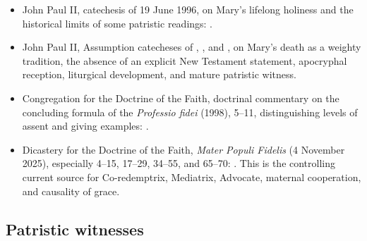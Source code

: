 \begin{itemize}
  \item John Paul II, catechesis of 19 June 1996, on Mary's lifelong holiness and the historical limits of some patristic readings: .
  \item John Paul II, Assumption catecheses of , , and , on Mary's death as a weighty tradition, the absence of an explicit New Testament statement, apocryphal reception, liturgical development, and mature patristic witness.
  \item Congregation for the Doctrine of the Faith, doctrinal commentary on the concluding formula of the \emph{Professio fidei} (1998), 5--11, distinguishing levels of assent and giving examples: .
  \item Dicastery for the Doctrine of the Faith, \emph{Mater Populi Fidelis} (4 November 2025), especially 4--15, 17--29, 34--55, and 65--70: . This is the controlling current source for Co-redemptrix, Mediatrix, Advocate, maternal cooperation, and causality of grace.
\end{itemize}

\subsection{Patristic witnesses}

